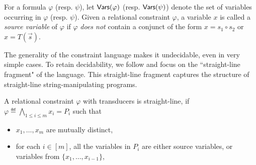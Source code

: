 \documentclass{llncs}
\newcommand{\mat}[1]{\color{cyan} {MH: #1 :HM} \color{black}}
\newcommand{\mat}[1]{}
\newcommand{\concat} {\circ}
\begin{document}
For a formula $\varphi$ (resp. $\psi$), let $\mathsf{Vars}(\varphi)$ (resp. $\mathsf{Vars}(\psi)$) denote the set of variables occurring in $\varphi$ (resp. $\psi$). Given a relational constraint $\varphi$, a variable $x$ is called a \emph{source variable} of $\varphi$ if $\varphi$ \emph{does not} contain a conjunct of the form $x = s_1 \concat s_2$ or $x = T(\vec{s})$.





 

The generality of the constraint language makes it undecidable,
even in very simple cases. To retain decidability, we follow \cite{LB16} and focus on the ``straight-line fragment" of the language. This straight-line fragment captures the structure of straight-line string-manipulating
programs.  

\begin{definition}
	A relational constraint $ \varphi$ with transducers is straight-line, if $\varphi \eqdef \bigwedge \limits_{1 \le i \le m} x_i = P_i$ such that
	\begin{itemize}
		\item $x_1,\dots, x_m$ are mutually distinct,
		\item for each $i \in [m]$, all the variables in $P_i$ are either source variables, or variables from $\{x_1,\dots, x_{i-1}\}$,
	\end{itemize}
\end{definition}
\end{document}
